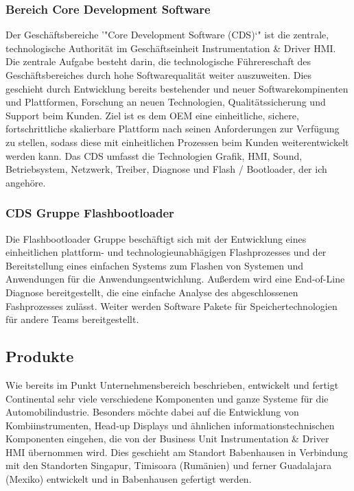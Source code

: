 \subsubsection{Bereich Core Development Software}
Der Geschäftsbereiche '"Core Development Software (CDS)`" ist die zentrale, technologische Authorität im Geschäftseinheit Instrumentation \& Driver HMI. Die zentrale Aufgabe besteht darin, die technologische Führereschaft des Geschäftsbereiches durch hohe Softwarequalität weiter auszuweiten. Dies geschieht durch Entwicklung bereits bestehender und neuer Softwarekompinenten und Plattformen, Forschung an neuen Technologien, Qualitätssicherung und Support beim Kunden.
Ziel ist es dem OEM eine einheitliche, sichere, fortschrittliche skalierbare Plattform nach seinen Anforderungen zur Verfügung zu stellen, sodass diese mit einheitlichen Prozessen beim Kunden weiterentwickelt werden kann.
Das CDS umfasst die Technologien Grafik, HMI, Sound, Betriebsystem, Netzwerk, Treiber, Diagnose und Flash / Bootloader, der ich angehöre. 

\subsubsection{CDS Gruppe Flashbootloader} %
Die Flashbootloader Gruppe beschäftigt sich mit der Entwicklung eines einheitlichen plattform- und technologieunabhägigen Flashprozesses und der Bereitstellung eines einfachen Systems zum Flashen von Systemen und Anwendungen für die Anwendungsentwichlung. 
Außerdem wird eine End-of-Line Diagnose bereitgestellt, die eine einfache Analyse des abgeschlossenen Fashprozesses zulässt. 
Weiter werden Software Pakete für Speichertechnologien für andere Teams bereitgestellt. 


\subsection{Produkte}

Wie bereits im Punkt Unternehmensbereich beschrieben, entwickelt und fertigt Continental sehr viele verschiedene Komponenten und ganze Systeme für die Automobilindustrie. 
Besonders möchte dabei auf die Entwicklung von Kombiinstrumenten, Head-up Displays und ähnlichen informationstechnischen Komponenten eingehen, die von der Business Unit Instrumentation \& Driver HMI übernommen wird. Dies geschieht am Standort Babenhausen in Verbindung mit den Standorten Singapur, Timisoara (Rumänien) und ferner Guadalajara (Mexiko) entwickelt und in Babenhausen gefertigt werden. 

